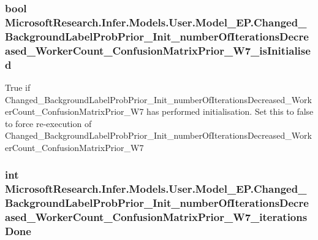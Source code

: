 \subsubsection[{Changed\+\_\+\+Background\+Label\+Prob\+Prior\+\_\+\+Init\+\_\+number\+Of\+Iterations\+Decreased\+\_\+\+Worker\+Count\+\_\+\+Confusion\+Matrix\+Prior\+\_\+\+W7\+\_\+is\+Initialised}]{\setlength{\rightskip}{0pt plus 5cm}bool Microsoft\+Research.\+Infer.\+Models.\+User.\+Model\+\_\+\+E\+P.\+Changed\+\_\+\+Background\+Label\+Prob\+Prior\+\_\+\+Init\+\_\+number\+Of\+Iterations\+Decreased\+\_\+\+Worker\+Count\+\_\+\+Confusion\+Matrix\+Prior\+\_\+\+W7\+\_\+is\+Initialised}\label{class_microsoft_research_1_1_infer_1_1_models_1_1_user_1_1_model___e_p_a2e04d5d41ac542942b2b715e26bd4038}


True if Changed\+\_\+\+Background\+Label\+Prob\+Prior\+\_\+\+Init\+\_\+number\+Of\+Iterations\+Decreased\+\_\+\+Worker\+Count\+\_\+\+Confusion\+Matrix\+Prior\+\_\+\+W7 has performed initialisation. Set this to false to force re-\/execution of Changed\+\_\+\+Background\+Label\+Prob\+Prior\+\_\+\+Init\+\_\+number\+Of\+Iterations\+Decreased\+\_\+\+Worker\+Count\+\_\+\+Confusion\+Matrix\+Prior\+\_\+\+W7

\hypertarget{class_microsoft_research_1_1_infer_1_1_models_1_1_user_1_1_model___e_p_ae58eb5265f8700b885d370e8fe410802}{}
\subsubsection[{Changed\+\_\+\+Background\+Label\+Prob\+Prior\+\_\+\+Init\+\_\+number\+Of\+Iterations\+Decreased\+\_\+\+Worker\+Count\+\_\+\+Confusion\+Matrix\+Prior\+\_\+\+W7\+\_\+iterations\+Done}]{\setlength{\rightskip}{0pt plus 5cm}int Microsoft\+Research.\+Infer.\+Models.\+User.\+Model\+\_\+\+E\+P.\+Changed\+\_\+\+Background\+Label\+Prob\+Prior\+\_\+\+Init\+\_\+number\+Of\+Iterations\+Decreased\+\_\+\+Worker\+Count\+\_\+\+Confusion\+Matrix\+Prior\+\_\+\+W7\+\_\+iterations\+Done}\label{class_microsoft_research_1_1_infer_1_1_models_1_1_user_1_1_model___e_p_ae58eb5265f8700b885d370e8fe410802}


